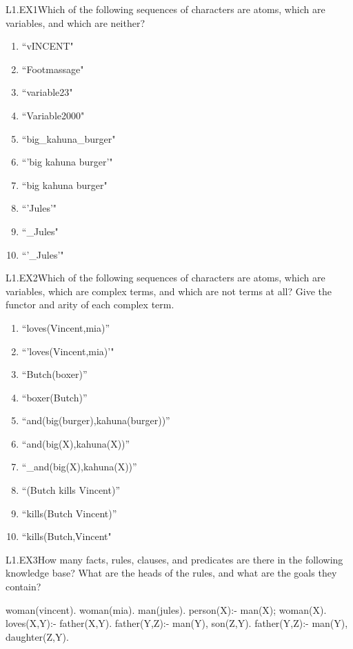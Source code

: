 \begin{LPNexercise}{L1.EX1}Which of the following sequences of
  characters are atoms, which are variables, and which are neither?

\begin{enumerate}
\item{}``vINCENT"
\item{}``Footmassage"
\item{}``variable23"
\item{}``Variable2000"
\item{}``big\_kahuna\_burger"
\item{}``'big kahuna burger'"
\item{}``big kahuna burger"
\item{}``'Jules'"
\item{}``\_Jules"
\item{}``'\_Jules'"
\end{enumerate}
\end{LPNexercise}

\begin{LPNexercise}{L1.EX2}Which of the following sequences of
  characters are atoms, which
  are variables, which are complex terms, and which are not terms at
  all?  Give the functor and arity of each complex term.

\begin{enumerate}
\item{}``loves(Vincent,mia)''
\item{}``'loves(Vincent,mia)'"
\item{}``Butch(boxer)''
\item{}``boxer(Butch)''
\item{}``and(big(burger),kahuna(burger))''
\item{}``and(big(X),kahuna(X))''
\item{}``\_and(big(X),kahuna(X))''
\item{}``(Butch kills Vincent)''
\item{}``kills(Butch Vincent)''
\item{}``kills(Butch,Vincent"
\end{enumerate}
\end{LPNexercise}

\begin{LPNexercise}{L1.EX3}How many facts, rules, clauses, and predicates are there in the
following knowledge base?  What are the heads of the rules, and what
are the goals they contain?

\begin{LPNcodedisplay}
woman(vincent).
woman(mia).
man(jules).
person(X):- man(X); woman(X).
loves(X,Y):- father(X,Y).
father(Y,Z):- man(Y), son(Z,Y).
father(Y,Z):- man(Y), daughter(Z,Y).
\end{LPNcodedisplay}
\end{LPNexercise}

